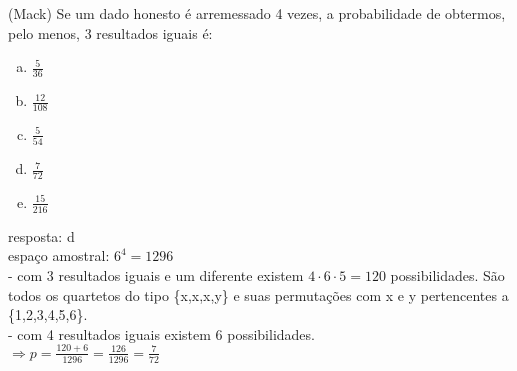 \begin{ex}
  (Mack) Se um dado honesto é arremessado 4 vezes, a probabilidade de obtermos, pelo menos, 3 resultados iguais é:
    \begin{enumerate}  [(a)]
        \item $\frac{5}{36}$
        \item $\frac{12}{108}$
        \item $\frac{5}{54}$
        \item $\frac{7}{72}$
        \item $\frac{15}{216}$
    \end{enumerate}
      \begin{sol}
      resposta: d \\
      espaço amostral: $6^4=1296$\\
      - com 3 resultados iguais e um diferente existem $4\cdot6\cdot5 = 120$ possibilidades.
      São todos os quartetos do tipo \{x,x,x,y\} e suas permutações com x e y pertencentes a \{1,2,3,4,5,6\}.\\  
      - com 4 resultados iguais existem 6 possibilidades.\\  
      $\Longrightarrow p=\frac{120+6}{1296}=\frac{126}{1296}=\frac{7}{72}$
      \end{sol}
 \end{ex}